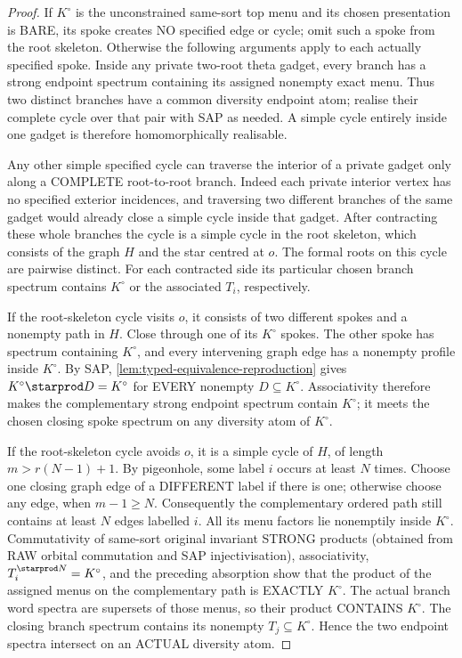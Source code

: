 \begin{proof}
If \(K^\circ\) is
the unconstrained same-sort
top menu and its chosen
presentation is BARE,
its spoke creates NO
specified edge or cycle;
omit such a spoke from
the root skeleton.
Otherwise the following
arguments apply to each
actually specified spoke.
Inside any private
two-root theta gadget,
every branch has a
strong endpoint spectrum
containing its assigned
nonempty exact menu.
Thus two distinct
branches have a common
diversity endpoint atom;
realise their complete
cycle over that pair
with SAP as needed.
A simple cycle entirely
inside one gadget is
therefore homomorphically
realisable.

Any other simple
specified cycle can
traverse the interior
of a private gadget
only along a COMPLETE
root-to-root branch.
Indeed each private
interior vertex has no
specified exterior
incidences, and
traversing two different
branches of the same
gadget would already
close a simple cycle
inside that gadget.
After contracting these
whole branches the
cycle is a simple cycle
in the root skeleton,
which consists of
the graph \(H\)
and the star centred
at \(o\). The formal
roots on this cycle
are pairwise distinct.
For each contracted
side its particular
chosen branch spectrum
contains \(K^\circ\)
or the associated
\(T_i\), respectively.

If the root-skeleton
cycle visits \(o\),
it consists of two
different spokes and
a nonempty path in
\(H\). Close through
one of its \(K^\circ\)
spokes. The other spoke
has spectrum containing
\(K^\circ\), and every
intervening graph edge
has a nonempty profile
inside \(K^\circ\).
By SAP,
\cref{lem:typed-equivalence-reproduction}
gives
\(K^\circ\starprod D
 =K^\circ\)
for EVERY nonempty
\(D\subseteq K^\circ\).
Associativity therefore
makes the complementary
strong endpoint spectrum
contain \(K^\circ\);
it meets the chosen
closing spoke spectrum
on any diversity atom
of \(K^\circ\).

If the root-skeleton
cycle avoids \(o\),
it is a simple cycle
of \(H\), of length
\(m>r(N-1)+1\).
By pigeonhole, some
label \(i\) occurs at
least \(N\) times.
Choose one closing
graph edge of a
DIFFERENT label if
there is one; otherwise
choose any edge,
when \(m-1\ge N\).
Consequently the
complementary ordered
path still contains
at least \(N\)
edges labelled \(i\).
All its menu factors
lie nonemptily inside
\(K^\circ\).
Commutativity of
same-sort original
invariant STRONG
products (obtained
from RAW orbital
commutation and SAP
injectivisation),
associativity,
\(T_i^{\starprod N}
 =K^\circ\),
and the preceding
absorption show that
the product of the
assigned menus on
the complementary
path is EXACTLY
\(K^\circ\).
The actual branch
word spectra are
supersets of those
menus, so their
product CONTAINS
\(K^\circ\).
The closing branch
spectrum contains
its nonempty
\(T_j\subseteq
K^\circ\). Hence the
two endpoint spectra
intersect on an
ACTUAL diversity
atom.


\end{proof}

